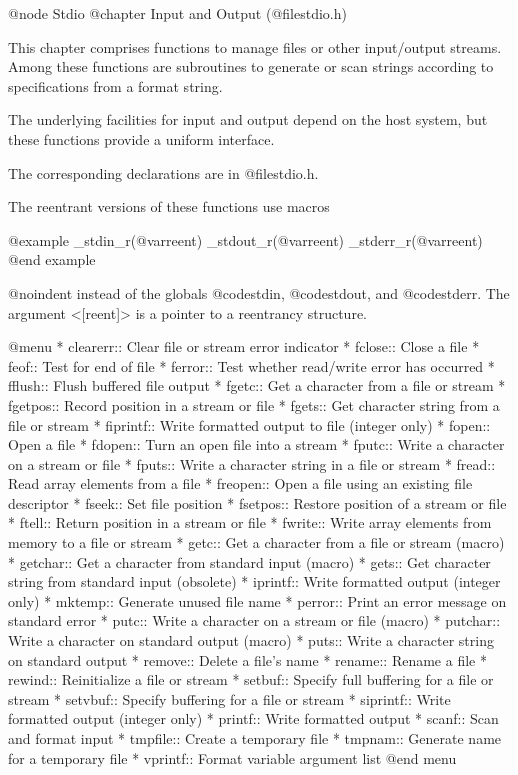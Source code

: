 @node Stdio
@chapter Input and Output (@file{stdio.h}) 

This chapter comprises functions to manage files
or other input/output streams. Among these functions are subroutines
to generate or scan strings according to specifications from a format string. 

The underlying facilities for input and output depend on the host
system, but these functions provide a uniform interface.

The corresponding declarations are in @file{stdio.h}.

The reentrant versions of these functions use macros

@example
_stdin_r(@var{reent})
_stdout_r(@var{reent})
_stderr_r(@var{reent})
@end example

@noindent
instead of the globals @code{stdin}, @code{stdout}, and
@code{stderr}.  The argument <[reent]> is a pointer to a reentrancy
structure.
 
@menu  
* clearerr::    Clear file or stream error indicator
* fclose::      Close a file
* feof::        Test for end of file
* ferror::      Test whether read/write error has occurred
* fflush::      Flush buffered file output
* fgetc::       Get a character from a file or stream
* fgetpos::     Record position in a stream or file
* fgets::       Get character string from a file or stream
* fiprintf::    Write formatted output to file (integer only)
* fopen::       Open a file
* fdopen::	Turn an open file into a stream
* fputc::       Write a character on a stream or file
* fputs::       Write a character string in a file or stream
* fread::       Read array elements from a file
* freopen::     Open a file using an existing file descriptor
* fseek::       Set file position
* fsetpos::     Restore position of a stream or file
* ftell::       Return position in a stream or file
* fwrite::      Write array elements from memory to a file or stream
* getc::        Get a character from a file or stream (macro)
* getchar::     Get a character from standard input (macro)
* gets::        Get character string from standard input (obsolete)
* iprintf::     Write formatted output (integer only)
* mktemp::      Generate unused file name
* perror::      Print an error message on standard error
* putc::        Write a character on a stream or file (macro)
* putchar::     Write a character on standard output (macro)
* puts::        Write a character string on standard output
* remove::      Delete a file's name
* rename::      Rename a file
* rewind::      Reinitialize a file or stream
* setbuf::      Specify full buffering for a file or stream
* setvbuf::     Specify buffering for a file or stream
* siprintf::    Write formatted output (integer only)
* printf::      Write formatted output
* scanf::       Scan and format input
* tmpfile::     Create a temporary file
* tmpnam::      Generate name for a temporary file
* vprintf::     Format variable argument list
@end menu 

